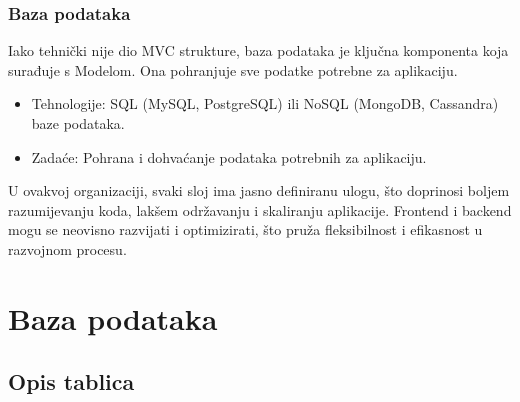  \subsubsection{Baza podataka}

Iako tehnički nije dio MVC strukture, baza podataka je ključna komponenta koja surađuje s Modelom. Ona pohranjuje sve podatke potrebne za aplikaciju.
\begin{itemize}
		  \item {Tehnologije: SQL (MySQL, PostgreSQL) ili NoSQL (MongoDB, Cassandra) baze podataka.}
		  \item {Zadaće: Pohrana i dohvaćanje podataka potrebnih za aplikaciju.}	
	   \end{itemize}

U ovakvoj organizaciji, svaki sloj ima jasno definiranu ulogu, što doprinosi boljem razumijevanju koda, lakšem održavanju i skaliranju aplikacije. Frontend i backend mogu se neovisno razvijati i optimizirati, što pruža fleksibilnost i efikasnost u razvojnom procesu.

\eject

				
		\section{Baza podataka}
		
		
			\subsection{Opis tablica}
				
